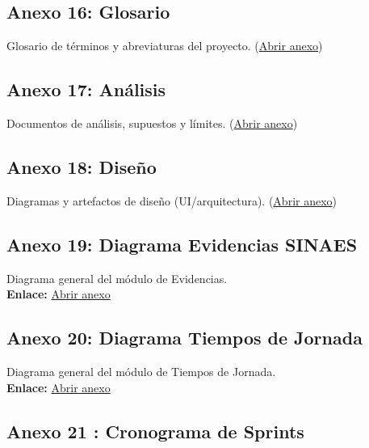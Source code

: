 \subsection*{Anexo 16: Glosario}
\label{anexo:glosario}
\parbox{\linewidth}{%
Glosario de términos y abreviaturas del proyecto.
(\href{https://drive.google.com/file/d/18UFM7d1duhJpcXTDCmMAK4PnTFuqFT9k/view?usp=sharing}{Abrir anexo})
}

\subsection*{Anexo 17: Análisis}
\label{anexo:analisis}
\parbox{\linewidth}{%
Documentos de análisis, supuestos y límites.
(\href{https://drive.google.com/file/d/1S_cPKigSkLcA06b0DwnT0mBnKnIiOwZz/view?usp=sharing}{Abrir anexo})
}

\subsection*{Anexo 18: Diseño}
\label{anexo:diseno}
\parbox{\linewidth}{%
Diagramas y artefactos de diseño (UI/arquitectura).
(\href{https://drive.google.com/file/d/1fP3GDwJTx6le_CSUnIHpsyVAWys5i6Xe/view?usp=sharing}{Abrir anexo})
}

\subsection*{Anexo 19: Diagrama Evidencias SINAES}
\label{anexo:anexo19}
Diagrama general del módulo de Evidencias.\\[2pt]
\textbf{Enlace:} \href{https://drive.google.com/file/d/1JOyRg4BCDVRNGavIcEJBhe_vZfon9DQJ/view?usp=sharing}{Abrir anexo}

\subsection*{Anexo 20: Diagrama Tiempos de Jornada}
\label{anexo:anexo20}
Diagrama general del módulo de Tiempos de Jornada.\\[2pt]
\textbf{Enlace:} \href{https://drive.google.com/file/d/1e3sLb27zRPAvATex8cs8AFXy211b11QI/view?usp=sharing}{Abrir anexo}

\subsection*{Anexo 21
: Cronograma de Sprints}

